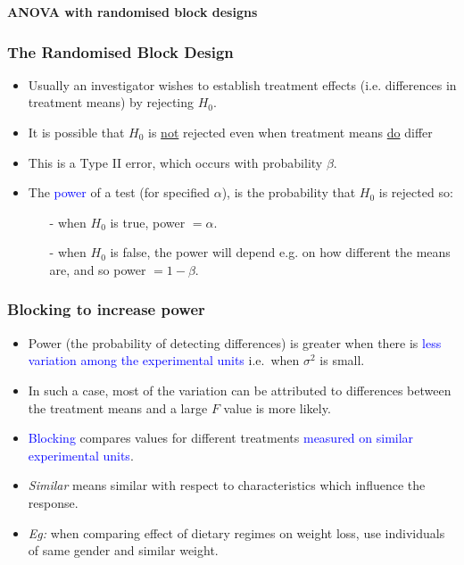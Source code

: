 \documentclass[12pt,xcolor=dvipsnames,handout,mathserif,aspectratio=169]{beamer}
\newcommand{\bbl}[1]{{\color{NavyBlue} \textbf{#1}}}
\newcommand{\tc}{\textcolor}
\begin{document}
\begin{frame}
\huge{\bbl{ANOVA with randomised block designs}}
\end{frame}

\begin{frame}
\frametitle{The Randomised Block Design}
\begin{itemize}
\item Usually an investigator wishes to establish treatment effects (i.e. differences in treatment
means) by rejecting $H_0$.
\vspace*{0.3cm}
\item It is possible that $H_0$ is \underline{not} rejected even when treatment means \underline{do} differ
\vspace{0.3cm}
\item This is a Type II error, which occurs with probability $\beta$.
\vspace*{0.3cm}
\item The \tc{blue}{power} of a test (for specified $\alpha$), is the probability that $H_0$ is rejected so:
\begin{itemize}
\vspace{0.2cm}
\item[-] when $H_0$ is true, power $ = \alpha$.
\vspace{0.2cm}
\item[-]when $H_0$ is false, the power will depend e.g. on how different the means are, and so power 
$= 1 - \beta$.
\end{itemize}
\end{itemize}
\end{frame}


\begin{frame}
\frametitle{Blocking to increase power}
\begin{itemize}
\item Power (the probability of detecting differences) is greater when there is \tc{blue}{less variation
among the experimental units}
i.e.~when $\sigma^2$ is small.
\vspace*{0.1cm}
\item In such a case, most of the variation can be attributed to differences between the treatment
means and a large $F$ value is more likely.
\vspace*{0.1cm}
\item \tc{blue}{Blocking} compares values for different treatments \tc{blue}{measured on similar experimental units}.
\vspace{0.1cm}
\item \textit{Similar} means similar with respect to characteristics which influence the response.
\vspace*{0.1cm}
\item \emph{Eg:} when comparing effect of dietary regimes on weight loss, use individuals of same gender
and similar weight.
\end{itemize}
\end{frame}
\end{document}
